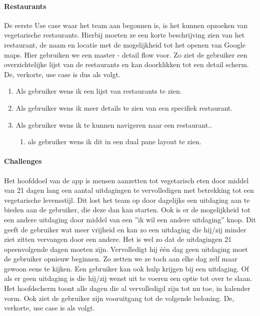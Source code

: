 \paragraph{Restaurants}

De eerste Use case waar het team aan begonnen is, is het kunnen opzoeken van vegetarische restaurants. Hierbij moeten ze een korte beschrijving zien van het restaurant, de naam en locatie met de mogelijkheid tot het openen van Google maps. Hier gebruiken we een master - detail flow voor. Zo ziet de gebruiker een overzichtelijke lijst van de restaurants en kan doorklikken tot een detail scherm. De, verkorte, use case is dus als volgt.

\begin{enumerate}
	\item Als gebruiker wens ik een lijst van restaurants te zien.
	\item Als gebruiker wens ik meer details te zien van een specifiek restaurant.
	\item Als gebruiker wens ik te kunnen navigeren naar een restaurant..
	 \begin{enumerate}
		\item als gebruiker wens ik dit in een dual pane layout te zien.
	\end{enumerate}
\end{enumerate}

\paragraph{Challenges}

Het hoofddoel van de app is mensen aanzetten tot vegetarisch eten door middel van 21 dagen lang een aantal uitdagingen te vervolledigen met betrekking tot een vegetarische levensstijl. Dit lost het team op door dagelijks een uitdaging aan te bieden aan de gebruiker, die deze dan kan starten. Ook is er de mogelijkheid tot een andere uitdaging door middel van een ''ik wil een andere uitdaging'' knop. Dit geeft de gebruiker wat meer vrijheid en kan zo een uitdaging die hij/zij minder ziet zitten vervangen door een andere. Het is wel zo dat de uitdagingen 21 opeenvolgende dagen moeten zijn. Vervolledigt hij één dag geen uitdaging moet de gebruiker opnieuw beginnen. Zo zetten we ze toch aan elke dag zelf maar gewoon eens te kijken. Een gebruiker kan ook hulp krijgen bij een uitdaging. Of als er geen uitdaging is die hij/zij wenst uit te voeren een optie tot over te slaan. Het hoofdscherm toont alle dagen die al vervolledigd zijn tot nu toe, in kalender vorm. Ook ziet de gebruiker zijn vooruitgang tot de volgende beloning. De, verkorte, use case is als volgt.

